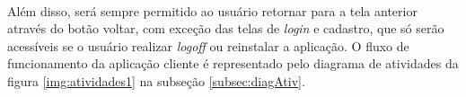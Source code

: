 \begin{figure}[!htb]
    \\
    \vspace{2.5em}
\label{fig:dag}
\end{figure}


Além disso, será sempre permitido ao usuário retornar para a tela anterior através do botão voltar, com exceção das telas de \textit{login} e cadastro, que só serão acessíveis se o usuário realizar \textit{logoff} ou reinstalar a aplicação. O fluxo de funcionamento da aplicação cliente é representado pelo diagrama de atividades da figura \ref{img:atividades1} na subseção \ref{subsec:diagAtiv}.

